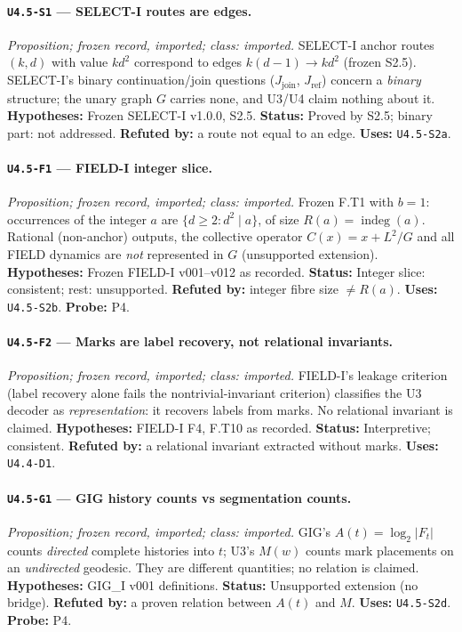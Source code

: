 \documentclass[11pt]{article}
\begin{document}
\paragraph{\texttt{U4.5-S1} --- SELECT-I routes are edges.} \emph{Proposition; frozen record, imported; class: imported.} SELECT-I anchor routes $(k,d)$ with value $kd^2$ correspond to edges $k(d-1)\to kd^2$ (frozen S2.5). SELECT-I's binary continuation/join questions ($J_{\mathrm{join}}$, $J_{\mathrm{ref}}$) concern a \emph{binary} structure; the unary graph $G$ carries none, and U3/U4 claim nothing about it. \textbf{Hypotheses:} Frozen SELECT-I v1.0.0, S2.5. \textbf{Status:} Proved by S2.5; binary part: not addressed. \textbf{Refuted by:} a route not equal to an edge. \textbf{Uses:} \texttt{U4.5-S2a}.

\paragraph{\texttt{U4.5-F1} --- FIELD-I integer slice.} \emph{Proposition; frozen record, imported; class: imported.} Frozen F.T1 with $b=1$: occurrences of the integer $a$ are $\{d\ge2:d^2\mid a\}$, of size $R(a)=\operatorname{indeg}(a)$. Rational (non-anchor) outputs, the collective operator $C(x)=x+L^2/G$ and all FIELD dynamics are \emph{not} represented in $G$ (unsupported extension). \textbf{Hypotheses:} Frozen FIELD-I v001--v012 as recorded. \textbf{Status:} Integer slice: consistent; rest: unsupported. \textbf{Refuted by:} integer fibre size $\ne R(a)$. \textbf{Uses:} \texttt{U4.5-S2b}. \textbf{Probe:} P4.

\paragraph{\texttt{U4.5-F2} --- Marks are label recovery, not relational invariants.} \emph{Proposition; frozen record, imported; class: imported.} FIELD-I's leakage criterion (label recovery alone fails the nontrivial-invariant criterion) classifies the U3 decoder as \emph{representation}: it recovers labels from marks. No relational invariant is claimed. \textbf{Hypotheses:} FIELD-I F4, F.T10 as recorded. \textbf{Status:} Interpretive; consistent. \textbf{Refuted by:} a relational invariant extracted without marks. \textbf{Uses:} \texttt{U4.4-D1}.

\paragraph{\texttt{U4.5-G1} --- GIG history counts vs segmentation counts.} \emph{Proposition; frozen record, imported; class: imported.} GIG's $A(t)=\log_2|F_t|$ counts \emph{directed} complete histories into $t$; U3's $M(w)$ counts mark placements on an \emph{undirected} geodesic. They are different quantities; no relation is claimed. \textbf{Hypotheses:} GIG\_I v001 definitions. \textbf{Status:} Unsupported extension (no bridge). \textbf{Refuted by:} a proven relation between $A(t)$ and $M$. \textbf{Uses:} \texttt{U4.5-S2d}. \textbf{Probe:} P4.
\end{document}

